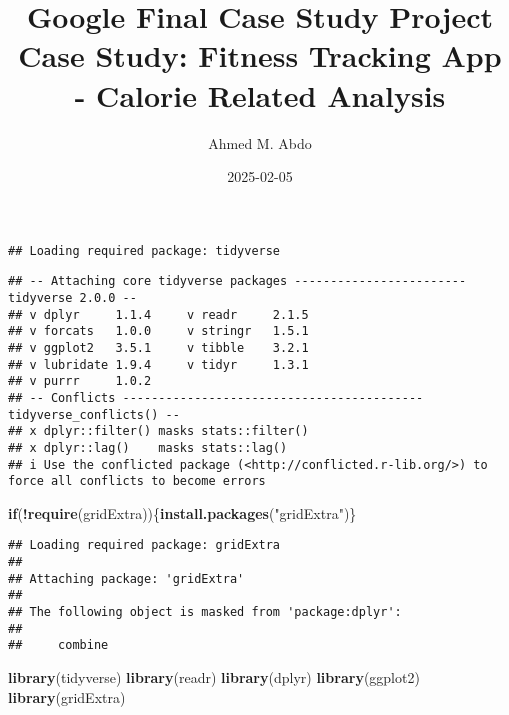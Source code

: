 \documentclass[
]{article}
\title{Google Final Case Study Project Case Study: Fitness Tracking App
- Calorie Related Analysis}
\author{Ahmed M. Abdo}
\date{2025-02-05}
\newenvironment{Shaded}{\begin{snugshade}}{\end{snugshade}}
\newcommand{\AttributeTok}[1]{\textcolor[rgb]{0.13,0.29,0.53}{#1}}
\newcommand{\CommentTok}[1]{\textcolor[rgb]{0.56,0.35,0.01}{\textit{#1}}}
\newcommand{\ConstantTok}[1]{\textcolor[rgb]{0.56,0.35,0.01}{#1}}
\newcommand{\ControlFlowTok}[1]{\textcolor[rgb]{0.13,0.29,0.53}{\textbf{#1}}}
\newcommand{\FunctionTok}[1]{\textcolor[rgb]{0.13,0.29,0.53}{\textbf{#1}}}
\newcommand{\NormalTok}[1]{#1}
\newcommand{\SpecialCharTok}[1]{\textcolor[rgb]{0.81,0.36,0.00}{\textbf{#1}}}
\newcommand{\StringTok}[1]{\textcolor[rgb]{0.31,0.60,0.02}{#1}}
\begin{document}
\maketitle

\begin{Shaded}
\end{Shaded}

\begin{verbatim}
## Loading required package: tidyverse
\end{verbatim}

\begin{verbatim}
## -- Attaching core tidyverse packages ------------------------ tidyverse 2.0.0 --
## v dplyr     1.1.4     v readr     2.1.5
## v forcats   1.0.0     v stringr   1.5.1
## v ggplot2   3.5.1     v tibble    3.2.1
## v lubridate 1.9.4     v tidyr     1.3.1
## v purrr     1.0.2     
## -- Conflicts ------------------------------------------ tidyverse_conflicts() --
## x dplyr::filter() masks stats::filter()
## x dplyr::lag()    masks stats::lag()
## i Use the conflicted package (<http://conflicted.r-lib.org/>) to force all conflicts to become errors
\end{verbatim}

\begin{Shaded}
\begin{Highlighting}[]
\ControlFlowTok{if}\NormalTok{(}\SpecialCharTok{!}\FunctionTok{require}\NormalTok{(gridExtra))\{}\FunctionTok{install.packages}\NormalTok{(}\StringTok{"gridExtra"}\NormalTok{)\}}
\end{Highlighting}
\end{Shaded}

\begin{verbatim}
## Loading required package: gridExtra
## 
## Attaching package: 'gridExtra'
## 
## The following object is masked from 'package:dplyr':
## 
##     combine
\end{verbatim}

\begin{Shaded}
\begin{Highlighting}[]
\FunctionTok{library}\NormalTok{(tidyverse)}
\FunctionTok{library}\NormalTok{(readr)}
\FunctionTok{library}\NormalTok{(dplyr)}
\FunctionTok{library}\NormalTok{(ggplot2)}
\FunctionTok{library}\NormalTok{(gridExtra)}
\end{Highlighting}
\end{Shaded}
\end{document}
